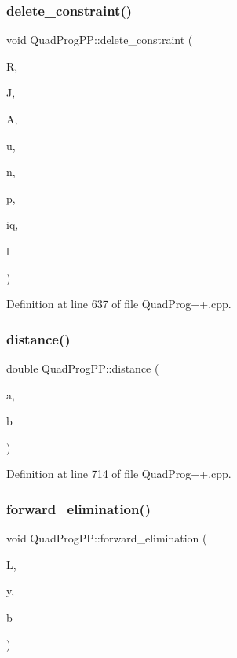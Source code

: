 \subsubsection{\texorpdfstring{delete\+\_\+constraint()}{delete\_constraint()}}
{\footnotesize\ttfamily void Quad\+Prog\+P\+P\+::delete\+\_\+constraint (\begin{DoxyParamCaption}\item[{Eigen\+::\+Matrix\+Xd \&}]{R,  }\item[{Eigen\+::\+Matrix\+Xd \&}]{J,  }\item[{Eigen\+::\+Vector\+Xi \&}]{A,  }\item[{Eigen\+::\+Vector\+Xd \&}]{u,  }\item[{int}]{n,  }\item[{int}]{p,  }\item[{int \&}]{iq,  }\item[{int}]{l }\end{DoxyParamCaption})}



Definition at line 637 of file Quad\+Prog++.\+cpp.

\hypertarget{namespaceQuadProgPP_a02250c1dfa52b656b38147eeb1b3df48}{}\label{namespaceQuadProgPP_a02250c1dfa52b656b38147eeb1b3df48} 
\subsubsection{\texorpdfstring{distance()}{distance()}}
{\footnotesize\ttfamily double Quad\+Prog\+P\+P\+::distance (\begin{DoxyParamCaption}\item[{double}]{a,  }\item[{double}]{b }\end{DoxyParamCaption})\hspace{0.3cm}{\ttfamily [inline]}}



Definition at line 714 of file Quad\+Prog++.\+cpp.

\hypertarget{namespaceQuadProgPP_acabfedbcb7167f67f0bc97d5528589ee}{}\label{namespaceQuadProgPP_acabfedbcb7167f67f0bc97d5528589ee} 
\subsubsection{\texorpdfstring{forward\+\_\+elimination()}{forward\_elimination()}}
{\footnotesize\ttfamily void Quad\+Prog\+P\+P\+::forward\+\_\+elimination (\begin{DoxyParamCaption}\item[{const Eigen\+::\+Matrix\+Xd \&}]{L,  }\item[{Eigen\+::\+Vector\+Xd \&}]{y,  }\item[{const Eigen\+::\+Vector\+Xd \&}]{b }\end{DoxyParamCaption})\hspace{0.3cm}{\ttfamily [inline]}}




